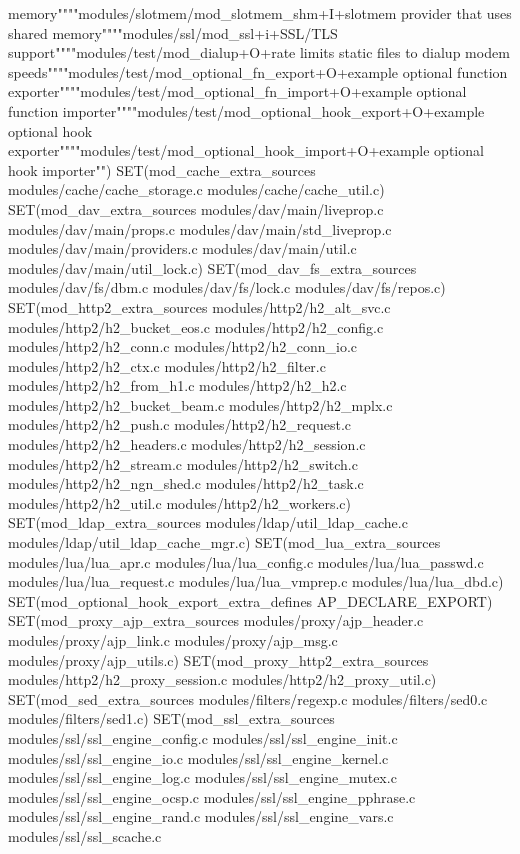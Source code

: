 memory""""modules/slotmem/mod\+\_\+slotmem\+\_\+shm+\+I+slotmem provider that uses shared memory""""modules/ssl/mod\+\_\+ssl+i+\+S\+S\+L/\+T\+L\+S support""""modules/test/mod\+\_\+dialup+\+O+rate limits static files to dialup modem speeds""""modules/test/mod\+\_\+optional\+\_\+fn\+\_\+export+\+O+example optional function exporter""""modules/test/mod\+\_\+optional\+\_\+fn\+\_\+import+\+O+example optional function importer""""modules/test/mod\+\_\+optional\+\_\+hook\+\_\+export+\+O+example optional hook exporter""""modules/test/mod\+\_\+optional\+\_\+hook\+\_\+import+\+O+example optional hook importer"") S\+E\+T(mod\+\_\+cache\+\_\+extra\+\_\+sources modules/cache/cache\+\_\+storage.\+c modules/cache/cache\+\_\+util.\+c) S\+E\+T(mod\+\_\+dav\+\_\+extra\+\_\+sources modules/dav/main/liveprop.\+c modules/dav/main/props.\+c modules/dav/main/std\+\_\+liveprop.\+c modules/dav/main/providers.\+c modules/dav/main/util.\+c modules/dav/main/util\+\_\+lock.\+c) S\+E\+T(mod\+\_\+dav\+\_\+fs\+\_\+extra\+\_\+sources modules/dav/fs/dbm.\+c modules/dav/fs/lock.\+c modules/dav/fs/repos.\+c) S\+E\+T(mod\+\_\+http2\+\_\+extra\+\_\+sources modules/http2/h2\+\_\+alt\+\_\+svc.\+c modules/http2/h2\+\_\+bucket\+\_\+eos.\+c modules/http2/h2\+\_\+config.\+c modules/http2/h2\+\_\+conn.\+c modules/http2/h2\+\_\+conn\+\_\+io.\+c modules/http2/h2\+\_\+ctx.\+c modules/http2/h2\+\_\+filter.\+c modules/http2/h2\+\_\+from\+\_\+h1.\+c modules/http2/h2\+\_\+h2.\+c modules/http2/h2\+\_\+bucket\+\_\+beam.\+c modules/http2/h2\+\_\+mplx.\+c modules/http2/h2\+\_\+push.\+c modules/http2/h2\+\_\+request.\+c modules/http2/h2\+\_\+headers.\+c modules/http2/h2\+\_\+session.\+c modules/http2/h2\+\_\+stream.\+c modules/http2/h2\+\_\+switch.\+c modules/http2/h2\+\_\+ngn\+\_\+shed.\+c modules/http2/h2\+\_\+task.\+c modules/http2/h2\+\_\+util.\+c modules/http2/h2\+\_\+workers.\+c) S\+E\+T(mod\+\_\+ldap\+\_\+extra\+\_\+sources modules/ldap/util\+\_\+ldap\+\_\+cache.\+c modules/ldap/util\+\_\+ldap\+\_\+cache\+\_\+mgr.\+c) S\+E\+T(mod\+\_\+lua\+\_\+extra\+\_\+sources modules/lua/lua\+\_\+apr.\+c modules/lua/lua\+\_\+config.\+c modules/lua/lua\+\_\+passwd.\+c modules/lua/lua\+\_\+request.\+c modules/lua/lua\+\_\+vmprep.\+c modules/lua/lua\+\_\+dbd.\+c) S\+E\+T(mod\+\_\+optional\+\_\+hook\+\_\+export\+\_\+extra\+\_\+defines A\+P\+\_\+\+D\+E\+C\+L\+A\+R\+E\+\_\+\+E\+X\+P\+O\+R\+T) S\+E\+T(mod\+\_\+proxy\+\_\+ajp\+\_\+extra\+\_\+sources modules/proxy/ajp\+\_\+header.\+c modules/proxy/ajp\+\_\+link.\+c modules/proxy/ajp\+\_\+msg.\+c modules/proxy/ajp\+\_\+utils.\+c) S\+E\+T(mod\+\_\+proxy\+\_\+http2\+\_\+extra\+\_\+sources modules/http2/h2\+\_\+proxy\+\_\+session.\+c modules/http2/h2\+\_\+proxy\+\_\+util.\+c) S\+E\+T(mod\+\_\+sed\+\_\+extra\+\_\+sources modules/filters/regexp.\+c modules/filters/sed0.\+c modules/filters/sed1.\+c) S\+E\+T(mod\+\_\+ssl\+\_\+extra\+\_\+sources modules/ssl/ssl\+\_\+engine\+\_\+config.\+c modules/ssl/ssl\+\_\+engine\+\_\+init.\+c modules/ssl/ssl\+\_\+engine\+\_\+io.\+c modules/ssl/ssl\+\_\+engine\+\_\+kernel.\+c modules/ssl/ssl\+\_\+engine\+\_\+log.\+c modules/ssl/ssl\+\_\+engine\+\_\+mutex.\+c modules/ssl/ssl\+\_\+engine\+\_\+ocsp.\+c modules/ssl/ssl\+\_\+engine\+\_\+pphrase.\+c modules/ssl/ssl\+\_\+engine\+\_\+rand.\+c modules/ssl/ssl\+\_\+engine\+\_\+vars.\+c modules/ssl/ssl\+\_\+scache.\+c 